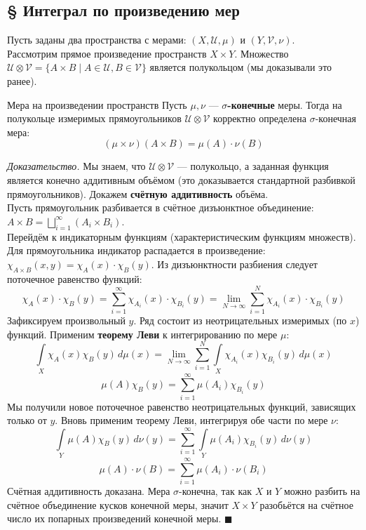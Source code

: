 \documentclass[12pt,a4paper]{article}
\newenvironment{Proof}[1][Доказательство]{\vspace{0.5em}\noindent\textit{#1.}\hspace{0.5em}\ignorespaces}{\hfill$\blacksquare$\vspace{1em}}
\begin{document}
\subsection{§ Интеграл по произведению мер}

Пусть заданы два пространства с мерами: $(X, \mathcal{U}, \mu)$ и $(Y, \mathcal{V}, \nu)$. \\
Рассмотрим прямое произведение пространств $X \times Y$. Множество $\mathcal{U} \otimes \mathcal{V} = \{ A \times B \mid A \in \mathcal{U}, B \in \mathcal{V} \}$ является полукольцом (мы доказывали это ранее).

\begin{Theorem}{Мера на произведении пространств}{}
Пусть $\mu, \nu$ — \textbf{$\sigma$-конечные} меры. Тогда на полукольце измеримых прямоугольников $\mathcal{U} \otimes \mathcal{V}$ корректно определена $\sigma$-конечная мера:
$$ (\mu \times \nu)(A \times B) = \mu(A) \cdot \nu(B) $$
\end{Theorem}

\begin{Proof}
Мы знаем, что $\mathcal{U} \otimes \mathcal{V}$ — полукольцо, а заданная функция является конечно аддитивным объёмом (это доказывается стандартной разбивкой прямоугольников). Докажем \textbf{счётную аддитивность} объёма. \\
Пусть прямоугольник разбивается в счётное дизъюнктное объединение: $A \times B = \bigsqcup\limits_{i=1}^{\infty} (A_i \times B_i)$. \\
Перейдём к индикаторным функциям (характеристическим функциям множеств). Для прямоугольника индикатор распадается в произведение: $\chi_{A \times B}(x,y) = \chi_A(x) \cdot \chi_B(y)$.
Из дизъюнктности разбиения следует поточечное равенство функций:
$$ \chi_A(x) \cdot \chi_B(y) = \sum\limits_{i=1}^{\infty} \chi_{A_i}(x) \cdot \chi_{B_i}(y) = \lim\limits_{N \to \infty} \sum\limits_{i=1}^N \chi_{A_i}(x) \cdot \chi_{B_i}(y) $$
Зафиксируем произвольный $y$. Ряд состоит из неотрицательных измеримых (по $x$) функций. Применим \textbf{теорему Леви} к интегрированию по мере $\mu$:
$$ \int\limits_X \chi_A(x) \chi_B(y) \, d\mu(x) = \lim\limits_{N \to \infty} \sum\limits_{i=1}^N \int\limits_X \chi_{A_i}(x) \chi_{B_i}(y) \, d\mu(x) $$
$$ \mu(A) \chi_B(y) = \sum\limits_{i=1}^{\infty} \mu(A_i) \chi_{B_i}(y) $$
Мы получили новое поточечное равенство неотрицательных функций, зависящих только от $y$. Вновь применим теорему Леви, интегрируя обе части по мере $\nu$:
$$ \int\limits_Y \mu(A) \chi_B(y) \, d\nu(y) = \sum\limits_{i=1}^{\infty} \int\limits_Y \mu(A_i) \chi_{B_i}(y) \, d\nu(y) $$
$$ \mu(A) \cdot \nu(B) = \sum\limits_{i=1}^{\infty} \mu(A_i) \cdot \nu(B_i) $$
Счётная аддитивность доказана. Мера $\sigma$-конечна, так как $X$ и $Y$ можно разбить на счётное объединение кусков конечной меры, значит $X \times Y$ разобьётся на счётное число их попарных произведений конечной меры.
\end{Proof}
\end{document}
